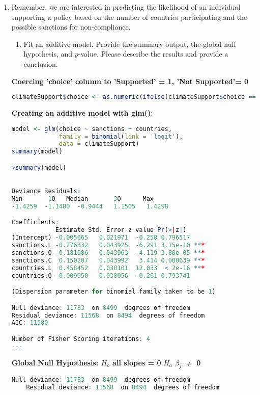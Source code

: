 \documentclass[12pt,letterpaper]{article}
\begin{document}
\begin{enumerate}
	\item
	Remember, we are interested in predicting the likelihood of an individual supporting a policy based on the number of countries participating and the possible sanctions for non-compliance.
	\begin{enumerate}
		\item [] Fit an additive model. Provide the summary output, the global null hypothesis, and $p$-value. Please describe the results and provide a conclusion.
	\end{enumerate}
\textbf{Coercing 'choice' column to 'Supported' = 1, 'Not Supported'= 0}
	\begin{lstlisting}[language=R]
		climateSupport$choice <- as.numeric(ifelse(climateSupport$choice == 'Supported', 1,0))
	\end{lstlisting}
\textbf{Creating an additive model with glm():}
\begin{lstlisting}[language= R]
model <- glm(choice ~ sanctions + countries, 
             family = binomial(link = 'logit'), 
             data = climateSupport)
summary(model)

>summary(model)
 

Deviance Residuals: 
Min       1Q   Median       3Q      Max  
-1.4259  -1.1480  -0.9444   1.1505   1.4298  

Coefficients:
            Estimate Std. Error z value Pr(>|z|)    
(Intercept) -0.005665   0.021971  -0.258 0.796517    
sanctions.L -0.276332   0.043925  -6.291 3.15e-10 ***
sanctions.Q -0.181086   0.043963  -4.119 3.80e-05 ***
sanctions.C  0.150207   0.043992   3.414 0.000639 ***
countries.L  0.458452   0.038101  12.033  < 2e-16 ***
countries.Q -0.009950   0.038056  -0.261 0.793741  

(Dispersion parameter for binomial family taken to be 1)

Null deviance: 11783  on 8499  degrees of freedom
Residual deviance: 11568  on 8494  degrees of freedom
AIC: 11580

Number of Fisher Scoring iterations: 4  
---
\end{lstlisting}

\textbf{Global Null Hypothesis: $H_o$ all slopes = 0}
\newline
\textbf{$H_a$ $\beta_j$ $\neq$ 0}

\begin{lstlisting}[language= R]
	Null deviance: 11783  on 8499  degrees of freedom
	Residual deviance: 11568  on 8494  degrees of freedom
	

\end{lstlisting}
\end{enumerate}
\end{document}
